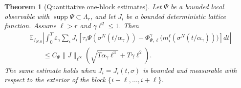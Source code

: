 \documentclass{article}
\newtheorem{theorem}{Theorem}
\begin{document}
\begin{theorem}[Quantitative one-block estimates]
\label{thm:clean-one-block}
Let \(\Psi\) be a bounded local observable with
\(\operatorname{supp}\Psi\subset\Lambda_r\), and let \(J_i\) be a bounded
deterministic lattice function.  Assume \(\ell>r\) and
\(\gamma\ell^2\le1\).  Then
\[
\begin{aligned}
&\mathbb E_{f_{N,0}}
\left|
\int_0^T
\varepsilon_\gamma\sum_i
J_i
\left[
\tau_i\Psi(\sigma^N(t/\alpha_\gamma))
-
\Phi_{\Psi,\ell}^{\gamma}
\bigl(m_i^\ell(\sigma^N(t/\alpha_\gamma))\bigr)
\right]dt
\right|
\\
&\qquad\le
C_\Psi\|J\|_{\ell^\infty}
\left(
\sqrt{T\alpha_\gamma\ell^3}
+T\gamma\ell^2
\right).
\end{aligned}
\]
The same estimate holds when \(J_i=J_i(t,\sigma)\) is bounded and measurable
with respect to the exterior of the block \(\{i-\ell,\dots,i+\ell\}\).
\end{theorem}
\end{document}
